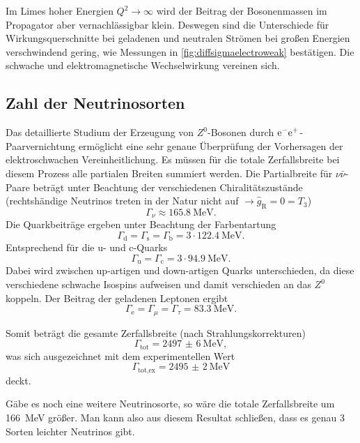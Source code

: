 Im Limes hoher Energien $Q^2\rightarrow\infty$ wird der Beitrag der Bosonenmassen im Propagator aber vernachlässigbar klein.
Deswegen sind die Unterschiede für Wirkungsquerschnitte bei geladenen und neutralen Strömen bei großen Energien verschwindend gering, wie Messungen in \autoref{fig:diffsigmaelectroweak} bestätigen.
Die schwache und elektromagnetische Wechselwirkung vereinen sich.

\subsection{Zahl der Neutrinosorten}
Das detaillierte Studium der Erzeugung von $Z^0$-Bosonen durch $\text{e}^-\text{e}^+$-Paarvernichtung ermöglicht eine sehr genaue Überprüfung der Vorhersagen der elektroschwachen Vereinheitlichung.
Es müssen für die totale Zerfallsbreite bei diesem Prozess alle partialen Breiten summiert werden.
Die Partialbreite für $\nu\bar{\nu}$-Paare beträgt unter Beachtung der verschiedenen Chiralitätszustände (rechtshändige Neutrinos treten in der Natur nicht auf $\rightarrow \hat{g}_\text{R} = 0 = T_3$)
\begin{equation*}
	\Gamma_\nu \approx \SI{165.8}{\MeV}.
\end{equation*}
Die Quarkbeiträge ergeben unter Beachtung der Farbentartung
\begin{equation*}
	\Gamma_\text{d} = \Gamma_\text{s} = \Gamma_\text{b} = 3\cdot\SI{122.4}{\MeV}.
\end{equation*}
Entsprechend für die u- und c-Quarks
\begin{equation*}
	\Gamma_\text{u} = \Gamma_\text{c} = 3\cdot\SI{94.9}{\MeV}.
\end{equation*}
Dabei wird zwischen up-artigen und down-artigen Quarks unterschieden, da diese verschiedene schwache Isospins aufweisen und damit verschieden an das $Z^0$ koppeln.
Der Beitrag der geladenen Leptonen ergibt
\begin{equation*}
	\Gamma_\text{e} = \Gamma_\mu = \Gamma_\tau = \SI{83.3}{\MeV}.
\end{equation*}

Somit beträgt die gesamte Zerfallsbreite (nach Strahlungskorrekturen)
\begin{equation*}
	\Gamma_\text{tot} = \SI{2497(6)}{\MeV},
\end{equation*}
was sich ausgezeichnet mit dem experimentellen Wert
\begin{equation*}
	\Gamma_\text{tot,ex} = \SI{2495(2)}{\MeV}
\end{equation*}
deckt.

Gäbe es noch eine weitere Neutrinosorte, so wäre die totale Zerfallsbreite um \SI{166}{\MeV} größer.
Man kann also aus diesem Resultat schließen, dass es genau 3 Sorten leichter Neutrinos gibt.
